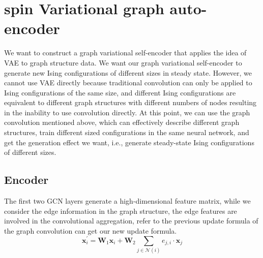 \documentclass[%
reprint,
amsmath,amssymb,
aps,
]{revtex4-2}
\begin{document}
	\section{spin Variational graph auto-encoder}
	We want to construct a graph variational self-encoder that applies the idea of VAE to graph structure data. We want our graph variational self-encoder to generate new Ising configurations of different sizes in steady state. However, we cannot use VAE directly because traditional convolution can only be applied to Ising configurations of the same size, and different Ising configurations are equivalent to different graph structures with different numbers of nodes resulting in the inability to use convolution directly. At this point, we can use the graph convolution mentioned above, which can effectively describe different graph structures, train different sized configurations in the same neural network, and get the generation effect we want, i.e., generate steady-state Ising configurations of different sizes.	
	\subsection{Encoder}
	The first two GCN layers generate a high-dimensional feature matrix, while we consider the edge information in the graph structure, the edge features are involved in the convolutional aggregation, refer to the previous update formula of the graph convolution can get our new update formula.
	\begin{equation}\label{upgradeFormula}
		\mathbf{x}^{\prime}_i = \mathbf{W}_1 \mathbf{x}_i + \mathbf{W}_2\sum_{j \in \mathcal{N}(i)} e_{j,i} \cdot \mathbf{x}_j
	\end{equation}
\end{document}
